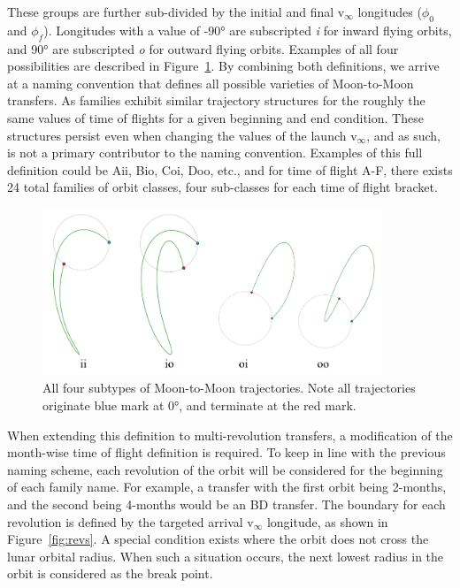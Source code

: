 \documentclass[letterpaper, paper,11pt]{AAS}	%
\begin{document}

These groups are further sub-divided by the initial and final v\(_\infty\) longitudes (\(\phi_0\) and \(\phi_f\)). Longitudes with a value of -90° are subscripted \emph{i} for inward flying orbits, and 90° are subscripted \emph{o} for outward flying orbits. Examples of all four possibilities are described in Figure~\ref{fig:subtypes}. By combining both definitions, we arrive at a naming convention that defines all possible varieties of Moon-to-Moon transfers. As families exhibit similar trajectory structures for the roughly the same values of time of flights for a given beginning and end condition. These structures persist even when changing the values of the launch v\(_\infty\), and as such, is not a primary contributor to the naming convention. Examples of this full definition could be Aii, Bio, Coi, Doo, etc., and for time of flight A-F, there exists 24 total families of orbit classes, four sub-classes for each time of flight bracket.

\begin{figure}[h]
    \centering
    \includegraphics[width=4in]{./etc/src (3).png}
    \caption{All four subtypes of Moon-to-Moon trajectories. Note all trajectories originate blue mark at 0°, and terminate at the red mark.}%
    \label{fig:subtypes}
\end{figure}


When extending this definition to multi-revolution transfers, a modification of the month-wise time of flight definition is required. To keep in line with the previous naming scheme, each revolution of the orbit will be considered for the beginning of each family name. For example, a transfer with the first orbit being 2-months, and the second being 4-months would be an BD transfer. The boundary for each revolution is defined by the targeted arrival v\(_\infty\) longitude, as shown in Figure~\ref{fig:revs}. A special condition exists where the orbit does not cross the lunar orbital radius. When such a situation occurs, the next lowest radius in the orbit is considered as the break point.
\end{document}
